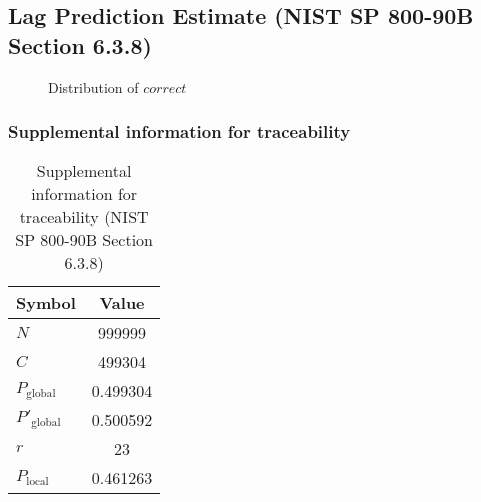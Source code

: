 \documentclass[a3paper,xelatex,english]{bxjsarticle}
\begin{document}
\subsection{Lag Prediction Estimate (NIST SP 800-90B Section 6.3.8)}
\begin{figure}[htbp]
\centering

\caption{Distribution of $correct$}
\end{figure}
\subsubsection{Supplemental information for traceability}
\renewcommand{\arraystretch}{1.8}
\begin{table}[h]
\caption{Supplemental information for traceability (NIST SP 800-90B Section 6.3.8)}
\begin{center}
\begin{tabular}{|l|c|}
\hline 
\rowcolor{anotherlightblue} %
Symbol				& Value \\ \hline 
$N$				& 999999\\ \hline 
$C$				& 499304\\ \hline 
$P_{\textrm{global}}$				& 0.499304\\ \hline 
$P'_{\textrm{global}}$			& 0.500592\\ \hline 
$r$				& 23\\ \hline 
$P_{\textrm{local}}$ 			& 0.461263\\ \hline
\end{tabular}
\end{center}
\end{table}
\renewcommand{\arraystretch}{1.4}
\clearpage
\end{document}
